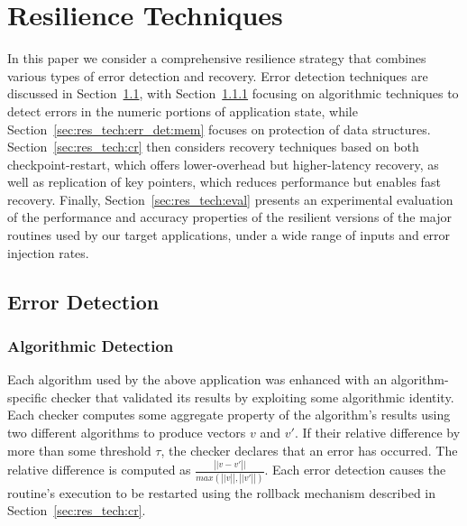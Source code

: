\documentclass{sig-alternate}
\newcommand{\sui}[1]{%
  \textcolor{green}{SC-#1}
}
\begin{document}
{\section{Resilience Techniques}
\label{sec:res_tech}

In this paper we consider a comprehensive resilience strategy that combines various types of error detection and recovery.
Error detection techniques are discussed in Section~\ref{sec:res_tech:err_det}, with Section~\ref{sec:res_tech:err_det:algo} focusing on algorithmic techniques to detect errors in the numeric portions of application state, while Section~\ref{sec:res_tech:err_det:mem} focuses on protection of data structures.
Section~\ref{sec:res_tech:cr} then considers recovery techniques based on both checkpoint-restart, which offers lower-overhead but higher-latency recovery, as well as replication of key pointers, which reduces performance but enables fast recovery.
Finally, Section~\ref{sec:res_tech:eval} presents an experimental evaluation of the performance and accuracy properties of the resilient versions of the major routines used by our target applications, under a wide range of inputs and error injection rates.

\subsection{Error Detection}
\label{sec:res_tech:err_det}

\vspace{-5pt}
\subsubsection{Algorithmic Detection}
\label{sec:res_tech:err_det:algo}


Each algorithm used by the above application was enhanced with an algorithm-specific checker that validated its results by exploiting some algorithmic identity.
Each checker computes some aggregate property of the algorithm's results using two different algorithms to produce vectors $v$ and $v'$.
If their relative difference by more than some threshold $\tau$, the checker declares that an error has occurred.
The relative difference is computed as $\frac{\left|| v-v' \right||}{max(\left||v\right||, \left||v'\right||)}$.
Each error detection causes the routine's execution to be restarted using the rollback mechanism described in Section~\ref{sec:res_tech:cr}.

}
\end{document}
